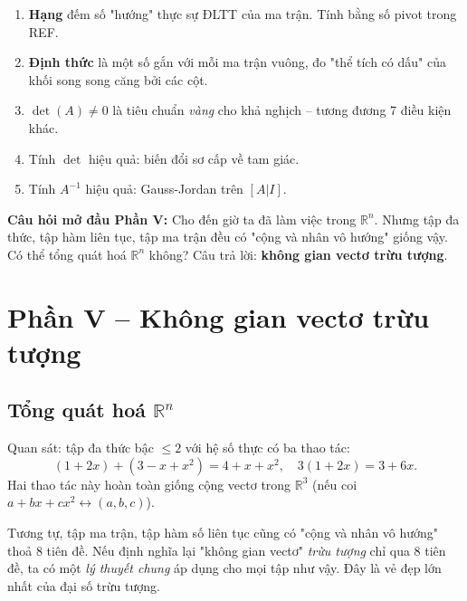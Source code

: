 \documentclass[12pt,a4paper]{article}
\begin{document}
\begin{tongket}[title={Tổng kết Phần IV}]
\begin{enumerate}
  \item \textbf{Hạng} đếm số "hướng" thực sự ĐLTT của ma trận. Tính bằng số pivot trong REF.
  \item \textbf{Định thức} là một số gắn với mỗi ma trận vuông, đo "thể tích có dấu" của khối song song căng bởi các cột.
  \item $\det(A) \ne 0$ là tiêu chuẩn \emph{vàng} cho khả nghịch -- tương đương 7 điều kiện khác.
  \item Tính $\det$ hiệu quả: biến đổi sơ cấp về tam giác.
  \item Tính $A^{-1}$ hiệu quả: Gauss-Jordan trên $[A | I]$.
\end{enumerate}

\textbf{Câu hỏi mở đầu Phần V:} Cho đến giờ ta đã làm việc trong $\mathbb{R}^n$. Nhưng tập đa thức, tập hàm liên tục, tập ma trận đều có "cộng và nhân vô hướng" giống vậy. Có thể tổng quát hoá $\mathbb{R}^n$ không? Câu trả lời: \textbf{không gian vectơ trừu tượng}.
\end{tongket}

\newpage

\section{Phần V -- Không gian vectơ trừu tượng}

\subsection{Tổng quát hoá $\mathbb{R}^n$}

\begin{dongco}
Quan sát: tập đa thức bậc $\le 2$ với hệ số thực có ba thao tác:
\[
  (1 + 2x) + (3 - x + x^2) = 4 + x + x^2,\quad 3(1 + 2x) = 3 + 6x.
\]
Hai thao tác này hoàn toàn giống cộng vectơ trong $\mathbb{R}^3$ (nếu coi $a + bx + cx^2 \leftrightarrow (a,b,c)$).

Tương tự, tập ma trận, tập hàm số liên tục cũng có "cộng và nhân vô hướng" thoả 8 tiên đề. Nếu định nghĩa lại "không gian vectơ" \emph{trừu tượng} chỉ qua 8 tiên đề, ta có một \emph{lý thuyết chung} áp dụng cho mọi tập như vậy. Đây là vẻ đẹp lớn nhất của đại số trừu tượng.
\end{dongco}
\end{document}
